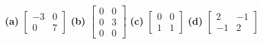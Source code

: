 \documentclass[12pt]{amsart}
\newcommand{\ds}{\displaystyle}
\begin{document}
\textbf{(a)} \quad $\ds \begin{bmatrix} -3 & 0 \\ 0 & 7 \end{bmatrix}$ \qquad
\textbf{(b)} \quad $\ds \begin{bmatrix} 0 & 0 \\ 0 & 3 \\ 0 & 0 \end{bmatrix}$ \qquad
\textbf{(c)} \quad $\ds \begin{bmatrix} 0 & 0 \\ 1 & 1 \end{bmatrix}$ \qquad
\textbf{(d)} \quad $\ds \begin{bmatrix} 2 & -1 \\ -1 & 2 \end{bmatrix}$
\end{document}
